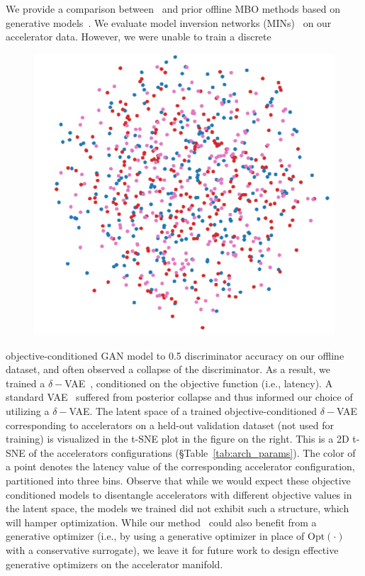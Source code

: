 %
We provide a comparison between \primemethodname\ and prior offline MBO methods based on generative models~\citep{kumar2019model}. 
%
We evaluate model inversion networks (MINs)~\citep{kumar2019model} on our accelerator data. However, we were unable to train a discrete
%
\begin{figure}
    \vspace{-0.1in}
    \includegraphics[width=\linewidth]{chapters/prime/figs/latent.png}
    \vspace{-0.1in}
\end{figure}
 objective-conditioned GAN model to 0.5 discriminator accuracy on our offline dataset, and often observed a collapse of the discriminator.
%
As a result, we trained a $\delta-$VAE~\citep{razavi2019preventing}, conditioned on the objective function (i.e., latency).
%
A standard VAE~\citep{kingma2013auto} suffered from posterior collapse and thus informed our choice of utilizing a $\delta-$VAE. 
%
The latent space of a trained objective-conditioned $\delta-$VAE corresponding to accelerators on a held-out validation dataset (not used for training) is visualized in the t-SNE plot in the figure on the right.
%
This is a 2D t-SNE of the accelerators configurations (\S Table~\ref{tab:arch_params}). 
%
The color of a point denotes the latency value of the corresponding accelerator configuration, partitioned into three bins. 
%
Observe that while we would expect these objective conditioned models to disentangle accelerators with different objective values in the latent space, the models we trained did not exhibit such a structure, which will hamper optimization.
%
While our method \primemethodname\ could also benefit from a generative optimizer (i.e., by using a generative optimizer in place of $\mathrm{Opt}(\cdot)$ with a conservative surrogate), we leave it for future work to design effective generative optimizers on the accelerator manifold.



